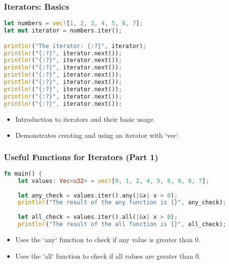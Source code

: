 \documentclass[aspectratio=169, table]{beamer}
\begin{document}
\begin{frame}[fragile]
\frametitle{Iterators: Basics}
\vspace{15pt}
\begin{lstlisting}[language=Rust]
let numbers = vec![1, 2, 3, 4, 5, 6, 7];
let mut iterator = numbers.iter();

println!("The iterator: {:?}", iterator); 
println!("{:?}", iterator.next());
println!("{:?}", iterator.next());
println!("{:?}", iterator.next());
println!("{:?}", iterator.next());
println!("{:?}", iterator.next());
println!("{:?}", iterator.next());
println!("{:?}", iterator.next());
println!("{:?}", iterator.next());
\end{lstlisting}
\begin{itemize}
\item Introduction to iterators and their basic usage.
\item Demonstrates creating and using an iterator with `vec`.
\end{itemize}
\end{frame}

\begin{frame}[fragile]
\frametitle{Useful Functions for Iterators (Part 1)}
\begin{lstlisting}[language=Rust]
fn main() {
	let values: Vec<u32> = vec![0, 1, 2, 4, 5, 6, 9, 8, 7];
	
	let any_check = values.iter().any(|&x| x > 0);
	println!("The result of the any function is {}", any_check);
	
	let all_check = values.iter().all(|&x| x > 0);
	println!("The result of the all function is {}", all_check);
\end{lstlisting}
\begin{itemize}
	\item Uses the `any` function to check if any value is greater than 0.
	\item Uses the `all` function to check if all values are greater than 0.
\end{itemize}
\end{frame}
\end{document}
